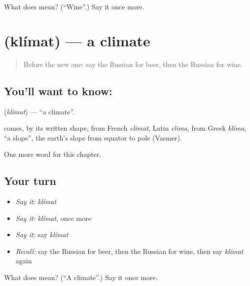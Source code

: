 \begin{tcolorbox}[breakable,colback=teal!4,colframe=teal!35!black,title={Before you move on}]
What does  mean? (\textquotedblleft{}Wine\textquotedblright{}.) Say it once more.
\end{tcolorbox}
\section[\texorpdfstring{\ru{климат} (klímat)}{климат (klímat)}]{ (klímat) — a climate}

\label{lesson:RU-C164-klimat}



\begin{quote}
Before the new one: say the Russian for beer, then the Russian for wine.
\end{quote}

\subsection*{You'll want to know: }
\textbf{} (\emph{klímat}) — \textquotedblleft{}a climate\textquotedblright{}.

\begin{cousinweb}
\textbf{} comes, by its written shape, from French \emph{climat}, Latin \emph{clima}, from Greek \emph{klíma}, \textquotedblleft{}a slope\textquotedblright{}, the earth's slope from equator to pole (Vasmer).
\end{cousinweb}

\begin{grammarlens}[title={What you've built}]
One more word for this chapter.
\end{grammarlens}

\subsection*{Your turn}
\begin{itemize}
\raggedright
  \item \emph{Say it:} \emph{klímat}
  \item \emph{Say it:} \emph{klímat}, once more
  \item \emph{Say it:} say \emph{klímat}
  \item \emph{Recall:} say the Russian for beer, then the Russian for wine, then say \emph{klímat} again
\end{itemize}

\begin{tcolorbox}[breakable,colback=teal!4,colframe=teal!35!black,title={Before you move on}]
What does  mean? (\textquotedblleft{}A climate\textquotedblright{}.) Say it once more.
\end{tcolorbox}
